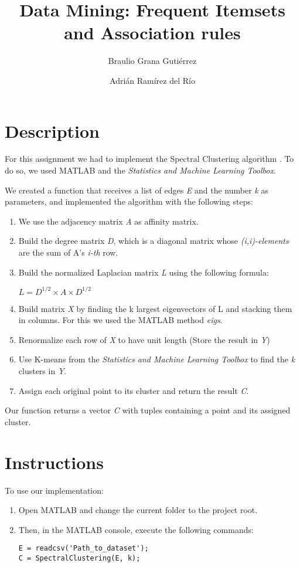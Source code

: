 \documentclass[12pt, a4paper]{article}
\title{Data Mining: Frequent Itemsets and Association rules}
\author{Braulio Grana Guti\'errez \and Adri\'an Ram\'irez del R\'io}
\begin{document}
\maketitle

\section*{Description}
For this assignment we had to implement the Spectral Clustering algorithm \cite{speclust01}. To do so, we used MATLAB and the \emph{Statistics and Machine Learning Toolbox}.

We created a function that receives a list of edges \emph{E} and the number \emph{k} as parameters, and implemented the algorithm with the following steps:

\begin{enumerate}
\item We use the adjacency matrix \emph{A} as affinity matrix.
\item Build the degree matrix \emph{D}, which is a diagonal matrix whose \emph{(i,i)-elements} are the sum of A's \emph{i-th} row.
\item Build the normalized Laplacian matrix \emph{L} using the following formula:
\begin{center}
$L = D^{1/2} \times A \times D^{1/2}$
\end{center}
\item Build matrix \emph{X} by finding the k largest eigenvectors of L and stacking them in columns. For this we used the MATLAB method \emph{eigs}.
\item Renormalize each row of \emph{X} to have unit length (Store the result in \emph{Y})
\item Use K-means from the \emph{Statistics and Machine Learning Toolbox} to find the \emph{k} clusters in \emph{Y}.
\item Assign each original point to its cluster and return the result \emph{C}.

\end{enumerate}

Our function returns a vector \emph{C} with tuples containing a point and its assigned cluster. 

\section*{Instructions}
To use our implementation:
\begin{enumerate}
\item Open MATLAB and change the current folder to the project root.
\item Then, in the MATLAB console, execute the following commands:
\lstset{language=MATLAB}
\begin{lstlisting}[frame=single]
E = readcsv('Path_to_dataset');
C = SpectralClustering(E, k);
\end{lstlisting}
\end{enumerate}
\end{document}
